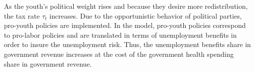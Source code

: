 As the youth's political weight rises and because they desire more redistribution, the tax rate $\tau_t$ increases. Due to the opportunistic behavior of political parties, pro-youth policies are implemented. In the model, pro-youth policies correspond to pro-labor policies and are translated in terms of unemployment benefits in order to insure the unemployment risk. Thus, the unemployment benefits share in government revenue increases at the cost of the government health spending share in government revenue.


